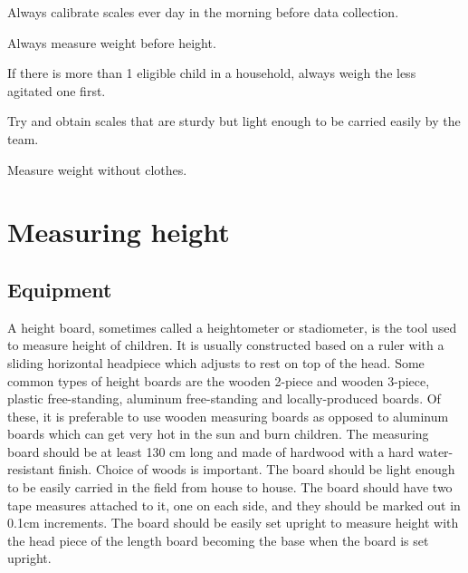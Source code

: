 \documentclass[12pt,]{book}
\theoremstyle{definition}
\theoremstyle{definition}
\theoremstyle{definition}
\theoremstyle{remark}
\begin{document}
Always calibrate scales ever day in the morning before data collection.

\item 

Always measure weight before height.

\item 

If there is more than 1 eligible child in a household, always weigh the
less agitated one first.

\item 

Try and obtain scales that are sturdy but light enough to be carried
easily by the team.

\item 

Measure weight without clothes.

\hypertarget{height}{%
\chapter{Measuring height}\label{height}}

\hypertarget{equipment-1}{%
\section{Equipment}\label{equipment-1}}

A height board, sometimes called a heightometer or stadiometer, is the
tool used to measure height of children. It is usually constructed based
on a ruler with a sliding horizontal headpiece which adjusts to rest on
top of the head. Some common types of height boards are the wooden
2-piece and wooden 3-piece, plastic free-standing, aluminum
free-standing and locally-produced boards. Of these, it is preferable to
use wooden measuring boards as opposed to aluminum boards which can get
very hot in the sun and burn children. The measuring board should be at
least 130 cm long and made of hardwood with a hard water-resistant
finish. Choice of woods is important. The board should be light enough
to be easily carried in the field from house to house. The board should
have two tape measures attached to it, one on each side, and they should
be marked out in 0.1cm increments. The board should be easily set
upright to measure height with the head piece of the length board
becoming the base when the board is set upright.
\end{document}
